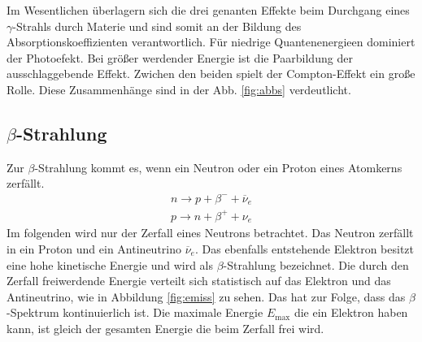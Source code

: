 Im Wesentlichen überlagern sich die drei genanten Effekte beim Durchgang eines $\gamma$-Strahls durch Materie und sind somit an der Bildung des Absorptionskoeffizienten verantwortlich. Für niedrige Quantenenergieen dominiert der Photoefekt. Bei größer werdender Energie ist die Paarbildung der ausschlaggebende Effekt. Zwichen den beiden spielt der Compton-Effekt ein große Rolle.
Diese Zusammenhänge sind in der Abb. \ref{fig:abbs} verdeutlicht.

\FloatBarrier
\subsection{$\beta$-Strahlung}
Zur $\beta$-Strahlung kommt es, wenn ein Neutron oder ein Proton eines Atomkerns zerfällt.
\begin{align*}
  n\to p+\beta^-+\overline\nu_e\\
  p\to n+\beta^++\nu_e
\end{align*}
Im folgenden wird nur der Zerfall eines Neutrons betrachtet.
Das Neutron zerfällt in ein Proton und ein Antineutrino $\overline\nu_e$. Das ebenfalls entstehende Elektron besitzt eine hohe kinetische Energie und wird als $\beta$-Strahlung bezeichnet.
Die durch den Zerfall freiwerdende Energie verteilt sich statistisch auf das Elektron und das Antineutrino, wie in Abbildung \ref{fig:emiss} zu sehen. Das hat zur Folge, dass das $\beta$-Spektrum kontinuierlich ist.
Die maximale Energie $E_{\text{max}}$ die ein Elektron haben kann, ist gleich der gesamten Energie die beim Zerfall frei wird.
